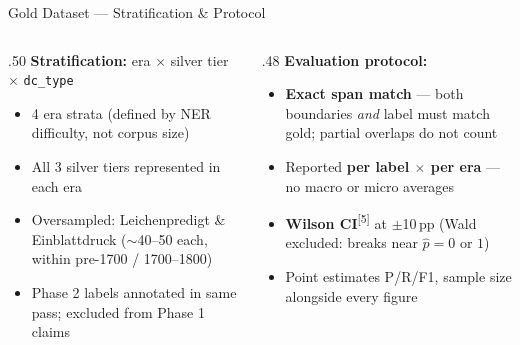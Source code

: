 \documentclass[xcolor,aspectratio=169,compress]{beamer}
\begin{document}
\begin{frame}{Gold Dataset --- Stratification \& Protocol}
  \small
  \begin{columns}
    \begin{column}{.50\textwidth}
      \textbf{Stratification:} era $\times$ silver tier $\times$ \texttt{dc\_type}
      \begin{itemize}\setlength{\itemsep}{2pt}
        \item 4 era strata (defined by NER difficulty, not corpus size)
        \item All 3 silver tiers represented in each era
        \item Oversampled: Leichenpredigt \& Einblattdruck ($\sim$40--50 each, within pre-1700 / 1700--1800)
        \item Phase 2 labels annotated in same pass; excluded from Phase 1 claims
      \end{itemize}
    \end{column}
    \begin{column}{.48\textwidth}
      \textbf{Evaluation protocol:}
      \begin{itemize}\setlength{\itemsep}{2pt}
        \item \textbf{Exact span match} --- both boundaries \emph{and} label must match gold; partial overlaps do not count
        \item Reported \textbf{per label $\times$ per era} --- no macro or micro averages
        \item \textbf{Wilson CI}\textsuperscript{[5]} at $\pm$10\,pp (Wald excluded: breaks near $\hat{p}=0$ or $1$)
        \item Point estimates P/R/F1, sample size alongside every figure
      \end{itemize}
    \end{column}
  \end{columns}
\end{frame}
\end{document}
